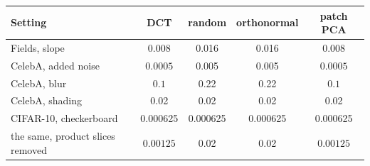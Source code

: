 \begin{tabular}{lcccc}
\toprule
Setting & DCT & random & orthonormal & patch PCA \\
\midrule
Fields, slope & $\mathbf{0.008}$ & 0.016 & 0.016 & $\mathbf{0.008}$ \\
CelebA, added noise & $\mathbf{0.0005}$ & 0.005 & 0.005 & $\mathbf{0.0005}$ \\
CelebA, blur & $\mathbf{0.1}$ & 0.22 & 0.22 & $\mathbf{0.1}$ \\
CelebA, shading & 0.02 & 0.02 & 0.02 & 0.02 \\
CIFAR-10, checkerboard & 0.000625 & 0.000625 & 0.000625 & 0.000625 \\
\quad the same, product slices removed & $\mathbf{0.00125}$ & 0.02 & 0.02 & $\mathbf{0.00125}$ \\
\bottomrule
\end{tabular}
